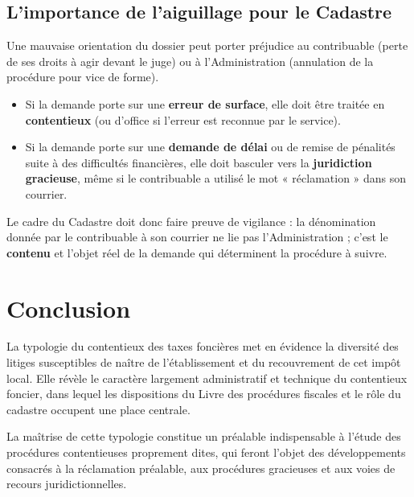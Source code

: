 \documentclass[Cours_contentieuxTF2026.tex]{subfiles}
\begin{document}
\subsection{L'importance de l'aiguillage pour le Cadastre}

Une mauvaise orientation du dossier peut porter préjudice au contribuable (perte de ses droits à agir devant le juge) ou à l'Administration (annulation de la procédure pour vice de forme). 

\begin{itemize}
	\item Si la demande porte sur une \textbf{erreur de surface}, elle doit être traitée en \textbf{contentieux} (ou d'office si l'erreur est reconnue par le service).
	\item Si la demande porte sur une \textbf{demande de délai} ou de remise de pénalités suite à des difficultés financières, elle doit basculer vers la \textbf{juridiction gracieuse}, même si le contribuable a utilisé le mot « réclamation » dans son courrier.
\end{itemize}

Le cadre du Cadastre doit donc faire preuve de vigilance : la dénomination donnée par le contribuable à son courrier ne lie pas l'Administration ; c'est le \textbf{contenu} et l'objet réel de la demande qui déterminent la procédure à suivre.

\section*{Conclusion}

La typologie du contentieux des taxes foncières met en évidence la diversité des
litiges susceptibles de naître de l’établissement et du recouvrement de cet impôt
local. Elle révèle le caractère largement administratif et technique du contentieux
foncier, dans lequel les dispositions du Livre des procédures fiscales et le rôle du
cadastre occupent une place centrale.

La maîtrise de cette typologie constitue un préalable indispensable à l’étude des
procédures contentieuses proprement dites, qui feront l’objet des développements
consacrés à la réclamation préalable, aux procédures gracieuses et aux voies de
recours juridictionnelles.
\end{document}
